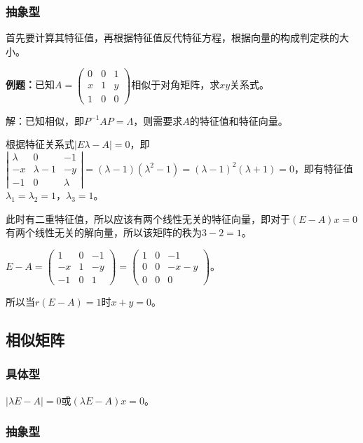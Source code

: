 \subsubsection{抽象型}

首先要计算其特征值，再根据特征值反代特征方程，根据向量的构成判定秩的大小。

\textbf{例题：}已知$A=\left(\begin{array}{ccc}
    0 & 0 & 1 \\
    x & 1 & y \\
    1 & 0 & 0
\end{array}\right)$相似于对角矩阵，求$xy$关系式。

解：已知相似，即$P^{-1}AP=\Lambda$，则需要求$A$的特征值和特征向量。

根据特征关系式$\vert E\lambda-A\vert=0$，即$\left\vert\begin{array}{ccc}
    \lambda & 0 & -1 \\
    -x & \lambda-1 & -y \\
    -1 & 0 & \lambda
\end{array}\right\vert=(\lambda-1)(\lambda^2-1)=(\lambda-1)^2(\lambda+1)=0$，即有特征值$\lambda_1=\lambda_2=1$，$\lambda_3=1$。

此时有二重特征值，所以应该有两个线性无关的特征向量，即对于$(E-A)x=0$有两个线性无关的解向量，所以该矩阵的秩为$3-2=1$。

$E-A=\left(\begin{array}{ccc}
    1 & 0 & -1 \\
    -x & 1 & -y \\
    -1 & 0 & 1
\end{array}\right)=\left(\begin{array}{ccc}
    1 & 0 & -1 \\
    0 & 0 & -x-y \\
    0 & 0 & 0
\end{array}\right)$。

所以当$r(E-A)=1$时$x+y=0$。

\subsection{相似矩阵}

\subsubsection{具体型}

$\vert \lambda E-A\vert=0$或$(\lambda E-A)x=0$。

\subsubsection{抽象型}

